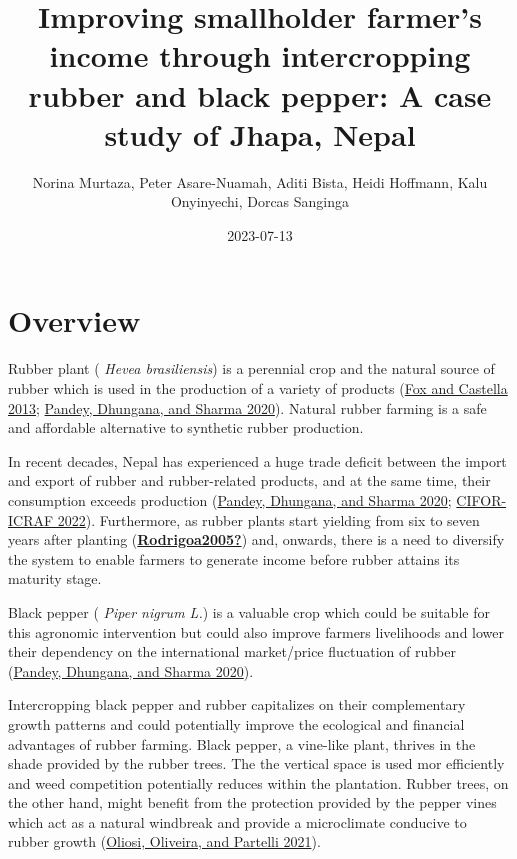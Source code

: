 \documentclass[
]{article}
\title{Improving smallholder farmer's income through intercropping rubber and black pepper: A case study of Jhapa, Nepal}
\author{Norina Murtaza, Peter Asare-Nuamah, Aditi Bista, Heidi Hoffmann, Kalu Onyinyechi, Dorcas Sanginga}
\date{2023-07-13}
\begin{document}
\maketitle

{
\setcounter{tocdepth}{2}
\tableofcontents
}
\hypertarget{overview}{%
\section{\texorpdfstring{\textbf{Overview}}{Overview}}\label{overview}}

Rubber plant ( \emph{Hevea brasiliensis}) is a perennial crop and the natural source of rubber which is used in the production of a variety of products (\protect\hyperlink{ref-fox2013}{Fox and Castella 2013}; \protect\hyperlink{ref-pandey2020}{Pandey, Dhungana, and Sharma 2020}). Natural rubber farming is a safe and affordable alternative to synthetic rubber production.

In recent decades, Nepal has experienced a huge trade deficit between the import and export of rubber and rubber-related products, and at the same time, their consumption exceeds production (\protect\hyperlink{ref-pandey2020}{Pandey, Dhungana, and Sharma 2020}; \protect\hyperlink{ref-cifor2022}{CIFOR-ICRAF 2022}). Furthermore, as rubber plants start yielding from six to seven years after planting (\protect\hyperlink{ref-Rodrigoa2005}{\textbf{Rodrigoa2005?}}) and, onwards, there is a need to diversify the system to enable farmers to generate income before rubber attains its maturity stage.

Black pepper ( \emph{Piper nigrum L.}) is a valuable crop which could be suitable for this agronomic intervention but could also improve farmers livelihoods and lower their dependency on the international market/price fluctuation of rubber (\protect\hyperlink{ref-pandey2020}{Pandey, Dhungana, and Sharma 2020}).

Intercropping black pepper and rubber capitalizes on their complementary growth patterns and could potentially improve the ecological and financial advantages of rubber farming. Black pepper, a vine-like plant, thrives in the shade provided by the rubber trees. The the vertical space is used mor efficiently and weed competition potentially reduces within the plantation. Rubber trees, on the other hand, might benefit from the protection provided by the pepper vines which act as a natural windbreak and provide a microclimate conducive to rubber growth (\protect\hyperlink{ref-oliosi2021}{Oliosi, Oliveira, and Partelli 2021}).
\end{document}

